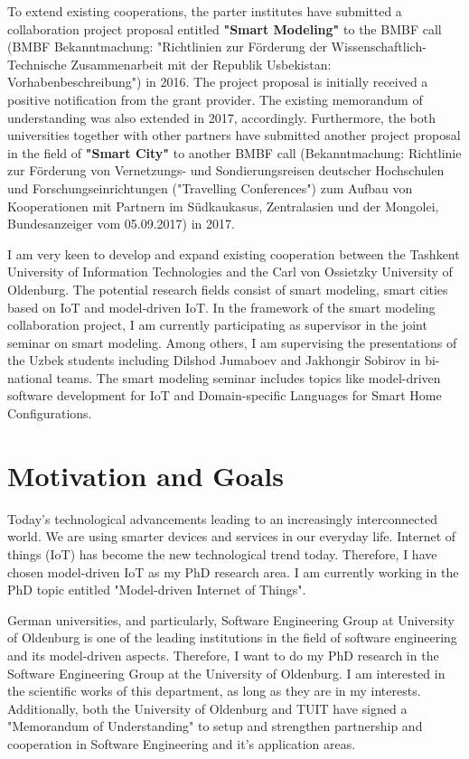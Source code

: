 \documentclass[10pt, oneside]{article}
\begin{document}
To extend existing cooperations, the parter institutes have submitted a collaboration project proposal entitled \textbf{"Smart Modeling"} to the BMBF call (BMBF Bekanntmachung: "Richtlinien zur Förderung der Wissenschaftlich-Technische Zusammenarbeit mit der Republik Usbekistan: Vorhabenbeschreibung") in 2016. The project proposal is initially received a positive notification from the grant provider. The existing memorandum of understanding was also extended in 2017, accordingly. Furthermore, the both universities together with other partners have submitted another project proposal in the field of \textbf{"Smart City"} to another BMBF call (Bekanntmachung: Richtlinie zur Förderung von Vernetzungs- und Sondierungsreisen deutscher Hochschulen und Forschungseinrichtungen ("Travelling Conferences") zum Aufbau von Kooperationen mit Partnern im Südkaukasus, Zentralasien und der Mongolei, Bundesanzeiger vom 05.09.2017) in 2017.

I am very keen to develop and expand existing cooperation between the Tashkent University of Information Technologies and the Carl von Ossietzky University of Oldenburg. The potential research fields consist of smart modeling, smart cities based on IoT and model-driven IoT. In the framework of the smart modeling collaboration project, I am currently participating as supervisor in the joint seminar on smart modeling. Among others, I am supervising the presentations of the Uzbek students including Dilshod Jumaboev and Jakhongir Sobirov in bi-national teams. The smart modeling seminar includes topics like model-driven software development for IoT and Domain-specific Languages for Smart Home Configurations.

\section{Motivation and Goals}
Today’s technological advancements leading to an increasingly interconnected world. We are using smarter devices and services in our everyday life. Internet of things (IoT) has become the new technological trend today. Therefore, I have chosen model-driven IoT as my PhD research area. I am currently working in the PhD topic entitled "Model-driven Internet of Things".

German universities, and particularly, Software Engineering Group at University of Oldenburg is one of the leading institutions in the field of software engineering and its model-driven aspects. Therefore, I want to do my PhD research in the Software Engineering Group at the University of Oldenburg. I am interested in the scientific works of this department, as long as they are in my interests. Additionally, both the University of Oldenburg and TUIT have signed a "Memorandum of Understanding" to setup and strengthen partnership and cooperation in Software 
Engineering and it’s application areas. 
\end{document}

